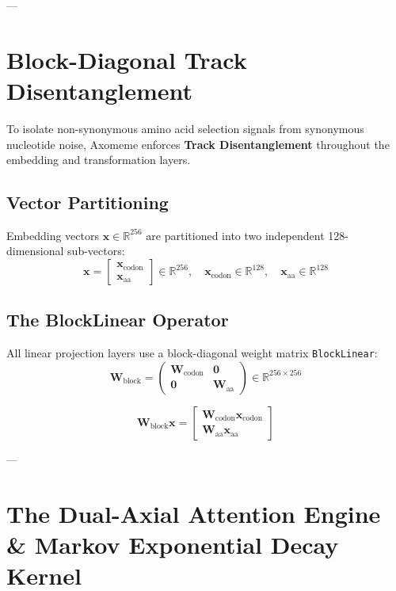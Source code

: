 \documentclass[11pt,a4paper]{article}
\begin{document}
---

\section{Block-Diagonal Track Disentanglement}

To isolate non-synonymous amino acid selection signals from synonymous nucleotide noise, Axomeme enforces \textbf{Track Disentanglement} throughout the embedding and transformation layers.

\subsection{Vector Partitioning}
Embedding vectors $\mathbf{x} \in \mathbb{R}^{256}$ are partitioned into two independent 128-dimensional sub-vectors:
\begin{equation}
\mathbf{x} = \begin{bmatrix} \mathbf{x}_{\text{codon}} \\ \mathbf{x}_{\text{aa}} \end{bmatrix} \in \mathbb{R}^{256}, \quad \mathbf{x}_{\text{codon}} \in \mathbb{R}^{128}, \quad \mathbf{x}_{\text{aa}} \in \mathbb{R}^{128}
\end{equation}

\subsection{The BlockLinear Operator}
All linear projection layers use a block-diagonal weight matrix \texttt{BlockLinear}:
\begin{equation}
\mathbf{W}_{\text{block}} = \begin{pmatrix} \mathbf{W}_{\text{codon}} & \mathbf{0} \\ \mathbf{0} & \mathbf{W}_{\text{aa}} \end{pmatrix} \in \mathbb{R}^{256 \times 256}
\end{equation}

\begin{equation}
\mathbf{W}_{\text{block}} \mathbf{x} = \begin{bmatrix} \mathbf{W}_{\text{codon}} \mathbf{x}_{\text{codon}} \\ \mathbf{W}_{\text{aa}} \mathbf{x}_{\text{aa}} \end{bmatrix}
\end{equation}

---

\section{The Dual-Axial Attention Engine \& Markov Exponential Decay Kernel}
\end{document}
